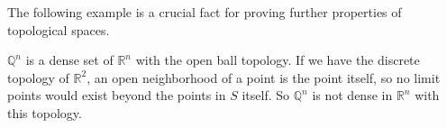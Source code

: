     The following example is a crucial fact for proving further properties of topological spaces. 

    \begin{example}
    $\mathbb{Q}^{n}$ is a dense set of $\mathbb{R}^{n}$ with the open ball topology. If we have the discrete topology of $\mathbb{R}^{2}$, an open neighborhood of a point is the point itself, so no limit points would exist beyond the points in $S$ itself. So $\mathbb{Q}^{n}$ is not dense in $\mathbb{R}^{n}$ with this topology. 
    \end{example}


